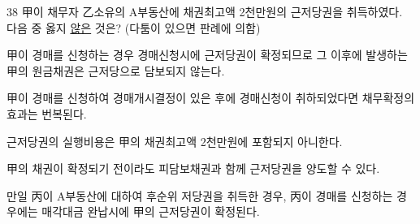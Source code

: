 \begin{question}{38}
甲이 채무자 乙소유의 A부동산에 채권최고액 2천만원의 근저당권을 취득하였다. 다음 중 옳지 \uline{않은} 것은? (다툼이 있으면 판례에 의함)
\begin{choices}
  \item 甲이 경매를 신청하는 경우 경매신청시에 근저당권이 확정되므로 그 이후에 발생하는 甲의 원금채권은 근저당으로 담보되지 않는다.
  \item 甲이 경매를 신청하여 경매개시결정이 있은 후에 경매신청이 취하되었다면 채무확정의 효과는 번복된다.
  \item 근저당권의 실행비용은 甲의 채권최고액 2천만원에 포함되지 아니한다.
  \item 甲의 채권이 확정되기 전이라도 피담보채권과 함께 근저당권을 양도할 수 있다.
  \item 만일 丙이 A부동산에 대하여 후순위 저당권을 취득한 경우, 丙이 경매를 신청하는 경우에는 매각대금 완납시에 甲의 근저당권이 확정된다.
\end{choices}
\end{question}
